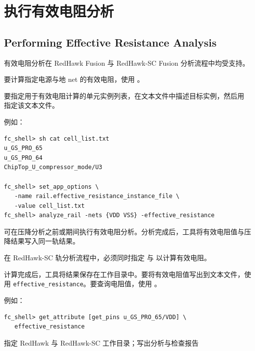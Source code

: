 \section{执行有效电阻分析}
\subsection*{Performing Effective Resistance Analysis}

\begin{noteBox}
有效电阻分析在 RedHawk Fusion 与 RedHawk-SC Fusion 分析流程中均受支持。
\end{noteBox}

要计算指定电源与地 net 的有效电阻，使用  。

要指定用于有效电阻计算的单元实例列表，在文本文件中描述目标实例，然后用  指定该文本文件。

例如：
\begin{lstlisting}
fc_shell> sh cat cell_list.txt
u_GS_PRO_65
u_GS_PRO_64
ChipTop_U_compressor_mode/U3

fc_shell> set_app_options \
   -name rail.effective_resistance_instance_file \
   -value cell_list.txt
fc_shell> analyze_rail -nets {VDD VSS} -effective_resistance
\end{lstlisting}

可在压降分析之前或期间执行有效电阻分析。分析完成后，工具将有效电阻值与压降结果写入同一轨结果。

\begin{noteBox}
在 RedHawk-SC 轨分析流程中，必须同时指定  与  以计算有效电阻。
\end{noteBox}

计算完成后，工具将结果保存在工作目录中。要将有效电阻值写出到文本文件，使用   \texttt{effective\_resistance}。要查询电阻值，使用 。

例如：
\begin{lstlisting}
fc_shell> get_attribute [get_pins u_GS_PRO_65/VDD] \
   effective_resistance
\end{lstlisting}

\begin{seeAlsoBox}
指定 RedHawk 与 RedHawk-SC 工作目录；写出分析与检查报告
\end{seeAlsoBox}

